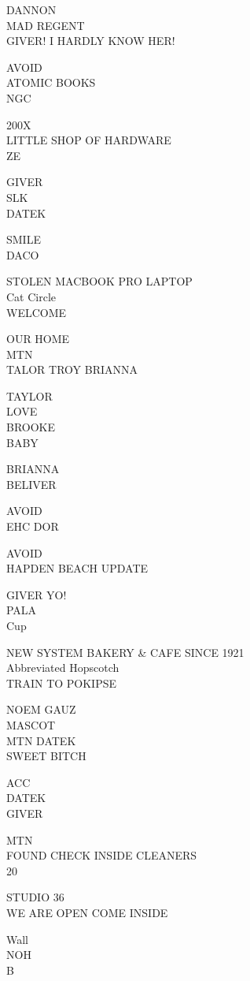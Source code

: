 \documentclass[10pt,letterpaper]{article}
\begin{document}
DANNON\\
MAD REGENT\\
GIVER!  I HARDLY KNOW HER!

AVOID\\
ATOMIC BOOKS\\
NGC

200X\\
LITTLE SHOP OF HARDWARE\\
ZE

GIVER\\
SLK\\
DATEK

SMILE\\
DACO

STOLEN MACBOOK PRO LAPTOP\\
Cat Circle\\
WELCOME

OUR HOME\\
MTN\\
TALOR TROY BRIANNA

TAYLOR\\
LOVE\\
BROOKE\\
BABY

BRIANNA\\
BELIVER

AVOID\\
EHC DOR

AVOID\\
HAPDEN BEACH UPDATE

GIVER YO!\\
PALA\\
Cup

NEW SYSTEM BAKERY \& CAFE SINCE 1921\\
Abbreviated Hopscotch\\
TRAIN TO POKIPSE

NOEM GAUZ\\
MASCOT\\
MTN DATEK\\
SWEET BITCH

ACC\\
DATEK\\
GIVER

MTN\\
FOUND CHECK INSIDE CLEANERS\\
20

STUDIO 36\\
WE ARE OPEN COME INSIDE

Wall\\
NOH\\
B
\end{document}
